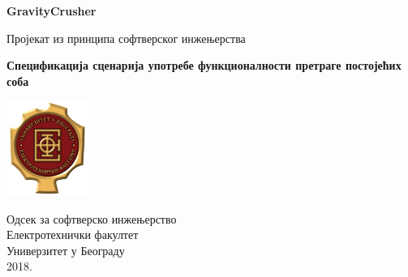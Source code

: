 \begin{titlepage}
	\begin{center}
	
		\vspace*{1cm}
		
		\Huge
		\textbf{GravityCrusher}
		
		\vspace{0.5cm}
		\LARGE
		Пројекат из принципа софтверског инжењерства
		
		\vspace{1.5cm}
		\Large		
		\textbf{Спецификација сценарија употребе функционалности претраге постојећих соба}
		
		\vfill
		
		\includegraphics[width=0.2\textwidth]{../../resources/etflogo}
		
		\large
		Одсек за софтверско инжењерство\\
		Електротехнички факултет\\
		Универзитет у Београду\\
		2018.
	
	\end{center}
\end{titlepage}